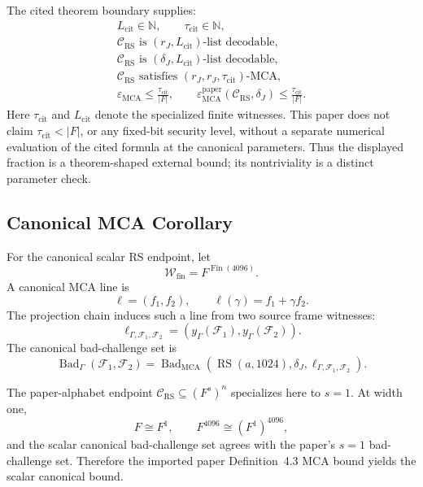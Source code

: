 \begin{assumption}
The cited theorem boundary supplies:
\[
\begin{gathered}
  L_{\mathrm{cit}}\in\mathbb N,\qquad
  \tau_{\mathrm{cit}}\in\mathbb N,\\
  \mathcal C_{\mathrm{RS}}\text{ is }(r_J,L_{\mathrm{cit}})\text{-list decodable},\\
  \mathcal C_{\mathrm{RS}}\text{ is }(\delta_J,L_{\mathrm{cit}})\text{-list decodable},\\
  \mathcal C_{\mathrm{RS}}\text{ satisfies }(r_J,r_J,\tau_{\mathrm{cit}})\text{-MCA},\\
  \varepsilon_{\mathrm{MCA}}\le
  \frac{\tau_{\mathrm{cit}}}{|F|},
  \qquad
  \varepsilon_{\mathrm{MCA}}^{\mathrm{paper}}(\mathcal C_{\mathrm{RS}},\delta_J)
  \le
  \frac{\tau_{\mathrm{cit}}}{|F|}.
\end{gathered}
\]
Here \(\tau_{\mathrm{cit}}\) and \(L_{\mathrm{cit}}\) denote the specialized
finite witnesses. This paper does not claim
\(\tau_{\mathrm{cit}}<|F|\), or any fixed-bit security level, without a
separate numerical evaluation of the cited formula at the canonical
parameters. Thus the displayed fraction is a theorem-shaped external bound;
its nontriviality is a distinct parameter check.
\end{assumption}

\subsection{Canonical MCA Corollary}

For the canonical scalar RS endpoint, let
\[
  \mathcal W_{\mathrm{fin}}=F^{\operatorname{Fin}(4096)}.
\]
A canonical MCA line is
\[
  \ell=(f_1,f_2),\qquad
  \ell(\gamma)=f_1+\gamma f_2.
\]
The projection chain induces such a line from two source frame witnesses:
\[
  \ell_{\Gamma,\mathcal F_1,\mathcal F_2}
  =
  (y_\Gamma(\mathcal F_1),y_\Gamma(\mathcal F_2)).
\]
The canonical bad-challenge set is
\[
  \operatorname{Bad}_{\Gamma}(\mathcal F_1,\mathcal F_2)
  =
  \operatorname{Bad}_{\mathrm{MCA}}
  (\operatorname{RS}(a,1024),\delta_J,\ell_{\Gamma,\mathcal F_1,\mathcal F_2}).
\]

The paper-alphabet endpoint \(\mathcal C_{\mathrm{RS}}\subseteq(F^s)^n\) specializes here to
\(s=1\). At width one,
\[
  F\cong F^1,\qquad
  F^{4096}\cong(F^1)^{4096},
\]
and the scalar canonical bad-challenge set agrees with the paper's
\(s=1\) bad-challenge set. Therefore the imported paper Definition~4.3 MCA
bound yields the scalar canonical bound.

